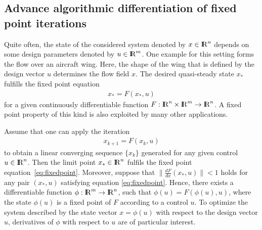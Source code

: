 \documentclass[11pt,twoside]{article}
\newcommand{\R}{{ {\rm I} \kern -.225em {\rm R} }}
\begin{document}
\subsection{Advance algorithmic differentiation of fixed point iterations}
%
Quite often, the state of the considered system denoted by $x\in\R^n$
depends on some design parameters denoted by $u\in\R^m$. One example for this setting
forms the flow over an aircraft wing. Here, the shape of the wing that
is defined by the design vector $u$  
determines the flow field $x$. The desired quasi-steady state $x_*$
fulfills the fixed point equation
\begin{align}
  \label{eq:fixedpoint}
  x_* = F(x_*,u)
\end{align}
for a given continuously differentiable function 
$F:\R^n\times\R^m\rightarrow\R^n$. A fixed point property of this kind is
also exploited by many other applications.

Assume that one can apply the iteration  
\begin{align}
\label{eq:iteration}
 x_{k+1} = F(x_k,u)
\end{align}
to obtain a linear converging sequence $\{x_k\}$ generated
for any given control $u\in\R^n$. Then the limit point $x_*\in\R^n$ fulfils the fixed
point equation~\eqref{eq:fixedpoint}. Moreover,
suppose that $\|\frac{dF}{dx}(x_*,u)\|<1$ holds for any pair
$(x_*,u)$ satisfying equation \eqref{eq:fixedpoint}.
Hence, there exists a
differentiable function $\phi:\R^m \rightarrow \R^n$,
such that $\phi(u) = F(\phi(u),u)$, where the state 
$\phi(u)$ is a fixed point of $F$ according to a control
$u$. To optimize the system described by the state vector $x=\phi(u)$ with respect to
the design vector $u$, derivatives of $\phi$ with respect
to $u$ are of particular interest.
\end{document}
